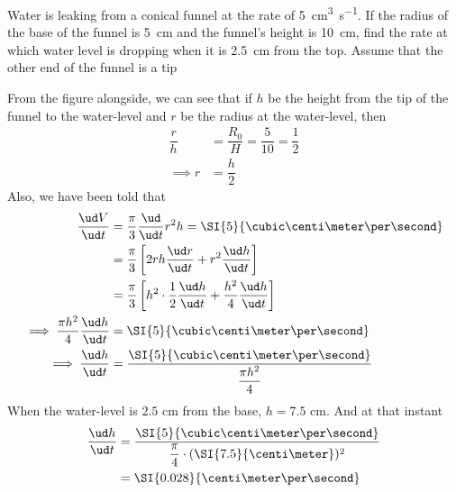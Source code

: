 

\question[3]  Water is leaking from a conical funnel at the rate of \SI{5}{\cubic\centi\metre\per\second}.
If the radius of the base of the funnel is \SI{5}{\centi\meter} and the funnel's height is 
\SI{10}{\centi\meter}, find the rate at which water level is dropping when it is 
\SI{2.5}{\centi\meter} from the top. Assume that the other end of the funnel is a tip


\ifprintanswers
\fi 

\begin{solution}[\fullpage]
	From the figure alongside, we can see that if 
	$h$ be the height from the tip of the funnel to the water-level and $r$
	be the radius at the water-level, then 
	\begin{align}
		\dfrac{r}{h} &= \dfrac{R_0}{H} = \dfrac{5}{10} = \dfrac{1}{2} \\
		\implies r &= \dfrac{h}{2}
	\end{align}
	Also, we have been told that 
	\begin{align}
		\dfrac{\ud V}{\ud t} &= \dfrac{\pi}{3}\dfrac{\ud}{\ud t}r^2h = \SI{5}{\cubic\centi\meter\per\second} \\
		&= \dfrac{\pi}{3}\left[2rh\dfrac{\ud r}{\ud t} + r^2\dfrac{\ud h}{\ud t}\right] \\
		&= \dfrac{\pi}{3}\left[h^2\cdot\dfrac{1}{2}\dfrac{\ud h}{\ud t} + \dfrac{h^2}{4}\dfrac{\ud h}{\ud t} \right] \\
		\implies \dfrac{\pi h^2}{4}\dfrac{\ud h}{\ud t} &= \SI{5}{\cubic\centi\meter\per\second} \\
		\implies \dfrac{\ud h}{\ud t} &= \dfrac{\SI{5}{\cubic\centi\meter\per\second}}
		{\dfrac{\pi h^2}{4}}
	\end{align}
	When the water-level is $2.5$ cm from the base, $h = 7.5$ cm. And at that instant
	\begin{align}
		\dfrac{\ud h}{\ud t} &= \dfrac{\SI{5}{\cubic\centi\meter\per\second}}
		{\dfrac{\pi}{4}\cdot(\SI{7.5}{\centi\meter})^2} \\
		&= \SI{0.028}{\centi\meter\per\second}
	\end{align}
\end{solution}
\ifprintanswers\begin{codex}\end{codex}\fi
